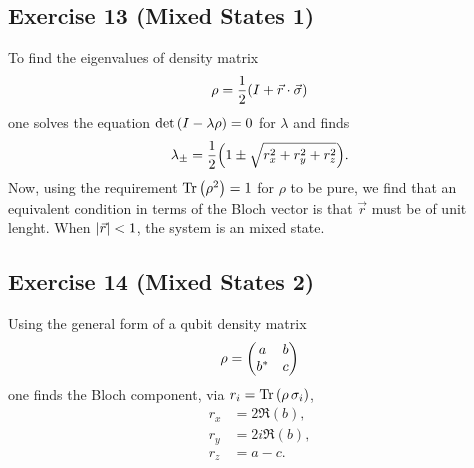 \subsection{Exercise 13 (Mixed States 1)}\noindent
To find the eigenvalues of density matrix
\begin{align}
\rho=\frac{1}{2}\qty(I+\vec r\cdot\vec\sigma)
\end{align}
one solves the equation $\det\qty(I-\lambda\rho)=0$ for $\lambda$ and finds
\begin{align}
\lambda_{\pm}=\frac{1}{2}\qty(1\pm\sqrt{r_x^2+r_y^2+r_z^2}).
\end{align}
Now, using the requirement $\Tr\qty(\rho^2)=1$ for $\rho$ to be pure, we find 
that an equivalent condition in terms of the Bloch vector is that $\vec r$ must 
be of unit lenght. When $\abs{\vec r}<1$, the system is an mixed state.

\subsection{Exercise 14 (Mixed States 2)}\noindent
Using the general form of a qubit density matrix
\begin{align}
\rho=\mqty(a&b\\b^*&c)
\end{align}
one finds the Bloch component, via $r_i=\Tr \qty(\rho\,\sigma_i)$,
\begin{subequations}
\begin{align}
r_x&=2\Re(b),\\
r_y&=2i\Re(b),\\
r_z&=a-c.
\end{align}
\end{subequations}